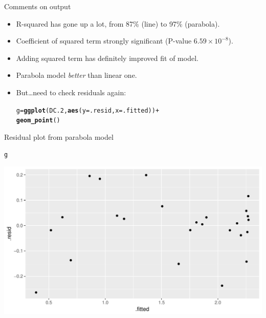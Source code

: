 \documentclass[unknownkeysallowed]{beamer}\usepackage[]{graphicx}\usepackage[]{color}
\makeatletter
\def\maxwidth{ %
  \ifdim\Gin@nat@width>\linewidth
    \linewidth
  \else
    \Gin@nat@width
  \fi
}
\newcommand{\hlopt}[1]{\textcolor[rgb]{0,0,0}{#1}}%
\newcommand{\hlstd}[1]{\textcolor[rgb]{0.345,0.345,0.345}{#1}}%
\newcommand{\hlkwb}[1]{\textcolor[rgb]{0.69,0.353,0.396}{#1}}%
\newcommand{\hlkwc}[1]{\textcolor[rgb]{0.333,0.667,0.333}{#1}}%
\newcommand{\hlkwd}[1]{\textcolor[rgb]{0.737,0.353,0.396}{\textbf{#1}}}%
\newenvironment{kframe}{%
 \def\at@end@of@kframe{}%
 \ifinner\ifhmode%
  \def\at@end@of@kframe{\end{minipage}}%
  \begin{minipage}{\columnwidth}%
 \fi\fi%
 \def\FrameCommand##1{\hskip\@totalleftmargin \hskip-\fboxsep
 \colorbox{shadecolor}{##1}\hskip-\fboxsep
     \hskip-\linewidth \hskip-\@totalleftmargin \hskip\columnwidth}%
 \MakeFramed {\advance\hsize-\width
   \@totalleftmargin\z@ \linewidth\hsize
   \@setminipage}}%
 {\par\unskip\endMakeFramed%
 \at@end@of@kframe}
\newenvironment{knitrout}{}{} %
\makeatother
\begin{document}
\begin{frame}[fragile]{Comments on output}

  \begin{itemize}
  \item R-squared has gone up a lot, from 87\% (line) to 97\% (parabola).
  \item Coefficient of squared term strongly significant (P-value
    $6.59 \times 10^{-8}$).
  \item Adding squared term has definitely improved fit of model.
  \item Parabola model \emph{better} than linear one.
  \item But\ldots need to check residuals again:

\begin{knitrout}
\color{fgcolor}\begin{kframe}
\begin{alltt}
\hlstd{g}\hlkwb{=}\hlkwd{ggplot}\hlstd{(DC.2,}\hlkwd{aes}\hlstd{(}\hlkwc{y}\hlstd{=.resid,}\hlkwc{x}\hlstd{=.fitted))}\hlopt{+}
  \hlkwd{geom_point}\hlstd{()}
\end{alltt}
\end{kframe}
\end{knitrout}

  \end{itemize}

\end{frame}

\begin{frame}[fragile]{Residual plot from parabola model}

\begin{knitrout}
\color{fgcolor}\begin{kframe}
\begin{alltt}
\hlstd{g}
\end{alltt}
\end{kframe}
\includegraphics[width=\maxwidth]{figure/unnamed-chunk-230-1} 

\end{knitrout}


\end{frame}
\end{document}
